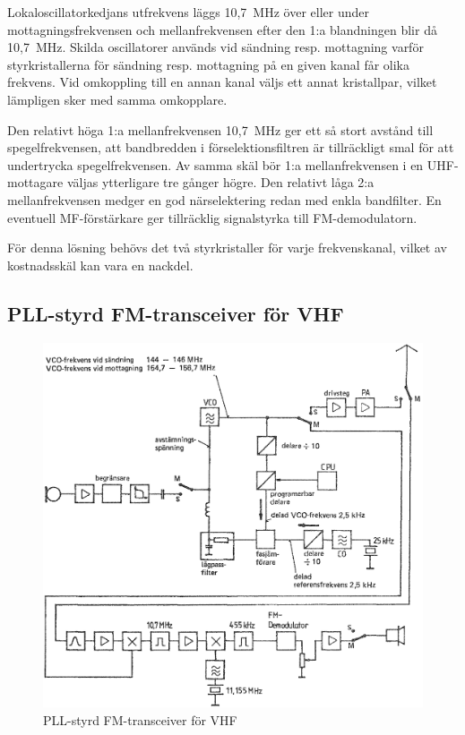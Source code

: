 Lokaloscillatorkedjans utfrekvens läggs 10,7~MHz över eller under
mottagningsfrekvensen och mellanfrekvensen efter den 1:a blandningen
blir då 10,7~MHz.
Skilda oscillatorer används vid sändning resp. mottagning varför
styrkristallerna för sändning resp. mottagning på en given kanal får
olika frekvens.
Vid omkoppling till en annan kanal väljs ett annat kristallpar, vilket
lämpligen sker med samma omkopplare.

Den relativt höga 1:a mellanfrekvensen 10,7~MHz ger ett så stort
avstånd till spegelfrekvensen, att bandbredden i förselektionsfiltren
är tillräckligt smal för att undertrycka spegelfrekvensen.
Av samma skäl bör 1:a mellanfrekvensen i en UHF-mottagare väljas ytterligare
tre gånger högre.
Den relativt låga 2:a mellanfrekvensen medger en god närselektering
redan med enkla bandfilter.
En eventuell MF-förstärkare ger tillräcklig signalstyrka till FM-demodulatorn.

För denna lösning behövs det två styrkristaller för varje
frekvenskanal, vilket av kostnadsskäl kan vara en nackdel.

\subsection{PLL-styrd FM-transceiver för VHF}

\begin{figure}
  \includegraphics[width=\textwidth]{images/cropped_pdfs/bild_2_5-13.pdf}
  \caption{PLL-styrd FM-transceiver för VHF}
  \label{fig:bildII5-13}
\end{figure}

